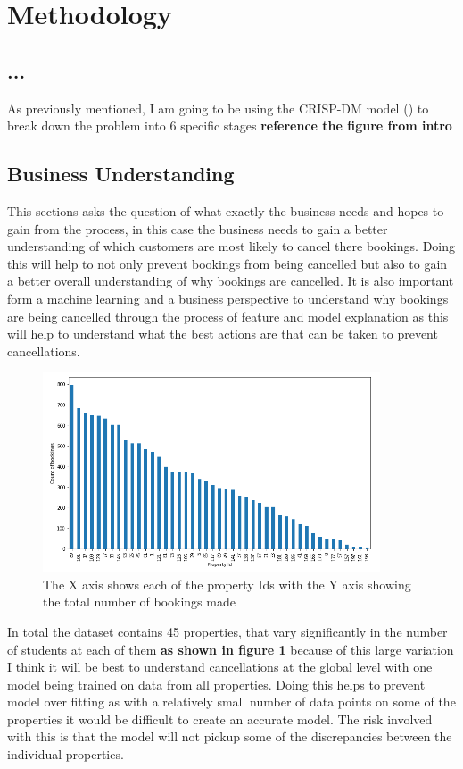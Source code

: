 \chapter{Methodology}
\label{ch:method}
\section{...}
As previously mentioned, I am going to be using the CRISP-DM model (\cite{WirthCRISP-DM:Mining}) to break down the problem into 6 specific stages \textbf{reference the figure from intro} 


\section{Business Understanding}

This sections asks the question of what exactly the business needs and hopes to gain from the process, in this case the business needs to gain a better understanding of which customers are most likely to cancel there bookings. Doing this will help to not only prevent bookings from being cancelled but also to gain a better overall understanding of why bookings are cancelled. It is also important form a machine learning and a business perspective to understand why bookings are being cancelled through the process of feature and model explanation as this will help to understand what the best actions are that can be taken to prevent cancellations.

\begin{figure}[hbt!]
 \includegraphics[width=10cm]{figures/bookings_by_property.png}
 \caption{The X axis shows each of the property Ids with the Y axis showing the total number of bookings made}
\end{figure}



In total the dataset contains 45 properties, that vary significantly in the number of students at each of them \textbf{as shown in figure 1} because of this large variation I think it will be best to understand cancellations at the global level with one model being trained on data from all properties. Doing this helps to prevent model over fitting as with a relatively small number of data points on some of the properties it would be difficult to create an accurate model. The risk involved with this is that the model will not pickup some of the discrepancies between the individual properties. 

